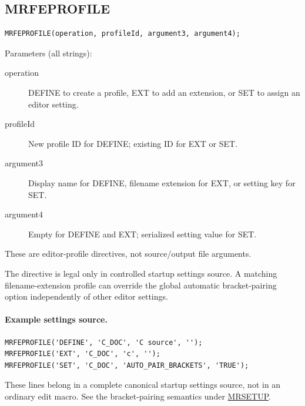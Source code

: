 \documentclass[a4paper,10pt,twoside,openany]{book}
\newenvironment{mrmacextension}{\begin{changebar}}{\end{changebar}}
\begin{document}
\begin{mrmacextension}
\label{prim:procedure-mrfeprofile}
\subsection*{MRFEPROFILE}
\begin{verbatim}
MRFEPROFILE(operation, profileId, argument3, argument4);
\end{verbatim}
Parameters (all strings):
\begin{description}
\item[operation] DEFINE to create a profile, EXT to add an extension, or SET
 to assign an editor setting.
\item[profileId] New profile ID for DEFINE; existing ID for EXT or SET.
\item[argument3] Display name for DEFINE, filename extension for EXT, or setting
 key for SET.
\item[argument4] Empty for DEFINE and EXT; serialized setting value for SET.
\end{description}
These are editor-profile directives, not source/output file arguments.

The directive is legal only in controlled startup settings source. A matching
filename-extension profile can override the global automatic bracket-pairing
option independently of other editor settings.

\paragraph{Example settings source.}
\begin{verbatim}
MRFEPROFILE('DEFINE', 'C_DOC', 'C source', '');
MRFEPROFILE('EXT', 'C_DOC', 'c', '');
MRFEPROFILE('SET', 'C_DOC', 'AUTO_PAIR_BRACKETS', 'TRUE');
\end{verbatim}
These lines belong in a complete canonical startup settings source, not in an
ordinary edit macro. See the bracket-pairing semantics under
\hyperref[prim:procedure-mrsetup]{MRSETUP}.
\end{mrmacextension}
\end{document}
